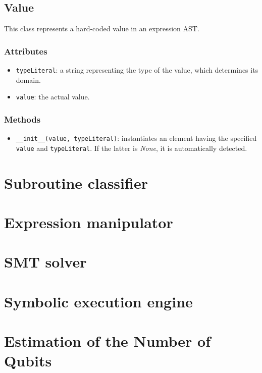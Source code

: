 \documentclass[12pt,a4paper]{report}
\theoremstyle{definition}
\theoremstyle{definition}
\theoremstyle{definition}
\begin{document}
\subsection{Value}
This class represents a hard-coded value in an expression AST.
\subsubsection{Attributes}
\begin{itemize}
    \itemsep 0em
    \item \texttt{typeLiteral}: a string representing the type of the value, which determines its domain.
    \item \texttt{value}: the actual value.
\end{itemize}
\subsubsection{Methods}
\begin{itemize}
    \itemsep 0em
    \item \texttt{\_\_init\_\_(value, typeLiteral)}: instantiates an element having the specified \texttt{value} and \texttt{typeLiteral}. If the latter is \textit{None}, it is automatically detected.
\end{itemize}



\section{Subroutine classifier}


\section{Expression manipulator}


\section{SMT solver}


\section{Symbolic execution engine}


\section{Estimation of the Number of Qubits}
\end{document}
